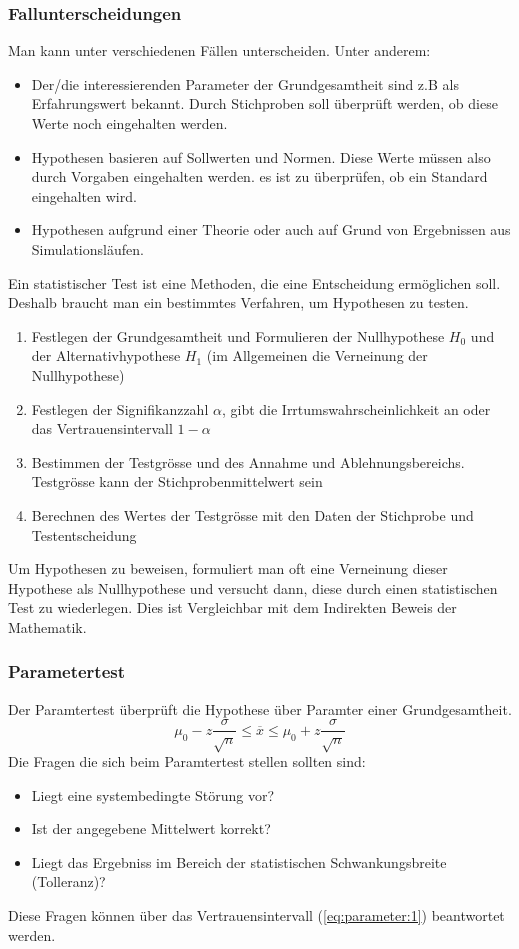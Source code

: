 \subsubsection{Fallunterscheidungen}
Man kann unter verschiedenen Fällen unterscheiden. Unter anderem:
\begin{itemize}
\item Der/die interessierenden Parameter der Grundgesamtheit sind z.B als Erfahrungswert bekannt. Durch Stichproben soll überprüft werden, ob diese Werte noch eingehalten werden. 
\item Hypothesen basieren auf Sollwerten und Normen. Diese Werte müssen also durch Vorgaben eingehalten werden. es ist zu überprüfen, ob ein Standard eingehalten wird.
\item Hypothesen aufgrund einer Theorie oder auch auf Grund von Ergebnissen aus Simulationsläufen.
\end{itemize}
Ein statistischer Test ist eine Methoden, die eine Entscheidung ermöglichen soll. Deshalb braucht man ein bestimmtes Verfahren, um Hypothesen zu testen.
\begin{enumerate}
\item Festlegen der Grundgesamtheit und Formulieren der Nullhypothese $H_0$ und der Alternativhypothese $H_1$ (im Allgemeinen die Verneinung der Nullhypothese)
\item Festlegen der Signifikanzzahl $\alpha$, gibt die Irrtumswahrscheinlichkeit an oder das Vertrauensintervall $1-\alpha$
\item Bestimmen der Testgrösse und des Annahme und Ablehnungsbereichs. Testgrösse kann der Stichprobenmittelwert sein
\item Berechnen des Wertes der Testgrösse mit den Daten der Stichprobe und Testentscheidung
\end{enumerate}
Um Hypothesen zu beweisen, formuliert man oft eine Verneinung dieser Hypothese als Nullhypothese und versucht dann, diese durch einen statistischen Test zu wiederlegen. Dies ist Vergleichbar mit dem Indirekten Beweis der Mathematik.
\subsubsection{Parametertest}
Der Paramtertest überprüft die Hypothese über Paramter einer Grundgesamtheit.
\begin{equation}
\mu_{0} - z \frac{\sigma}{\sqrt{n}}\leq\overline{x}\leq\mu_{0}+z \frac{\sigma}{\sqrt{n}} \label{eq:parameter:1}
\end{equation}
Die Fragen die sich beim Paramtertest stellen sollten sind:
\begin{itemize}
\item Liegt eine systembedingte Störung vor?
\item Ist der angegebene Mittelwert korrekt?
\item Liegt das Ergebniss im Bereich der statistischen Schwankungsbreite (Tolleranz)?
\end{itemize}
Diese Fragen können über das Vertrauensintervall (\autoref{eq:parameter:1}) beantwortet werden.
